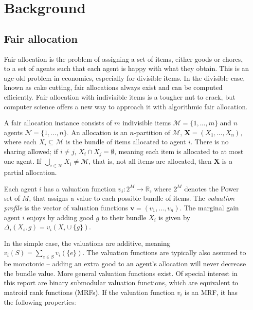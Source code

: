 \section{Background}\label{background}

\subsection{Fair allocation}
Fair allocation is the problem of assigning a set of items, either goods or chores, to a set of agents such that each agent is happy with what they obtain. This is an age-old problem in economics, especially for divisible items. In the divisible case, known as cake cutting, fair allocations always exist and can be computed efficiently. Fair allocation with indivisible items is a tougher nut to crack, but computer science offers a new way to approach it with algorithmic fair allocation.

A fair allocation instance consists of $m$ indivisible items $\mathcal{M} = \{1, \ldots ,m\}$ and $n$ agents $\mathcal{N} = \{1, \ldots ,n\}$. An allocation is an $n$-partition of $\mathcal{M}$, $\textbf{X} = (X_1, \ldots, X_n)$, where each $X_i \subseteq \mathcal{M}$ is the bundle of items allocated to agent $i$. There is no sharing allowed; if $i \not = j$, $X_i \cap X_j = \emptyset$, meaning each item is allocated to at most one agent. If $\bigcup_{i \in \mathcal{N} } X_i  \not =  \mathcal{M}$, that is, not all items are allocated, then $\textbf{X}$ is a partial allocation.

Each agent $i$ has a valuation function $v_i: 2^M \rightarrow \mathbb{R}$, where $2^M$ denotes the Power set of $M$, that assigns a value to each possible bundle of items. The \textit{valuation profile} is the vector of valuation functions $\mathbf{v} = (v_1, \ldots, v_n)$. The marginal gain agent $i$ enjoys by adding good $g$ to their bundle $X_i$ is given by $\Delta_i(X_i, g) = v_i(X_i \cup \{g\})$.

In the simple case, the valuations are additive, meaning $v_i(S) = \sum_{e \in S} v_i(\{e\})$. The valuation functions are typically also assumed to be monotonic – adding an extra good to an agent's allocation will never decrease the bundle value. More general valuation functions exist. Of special interest in this report are binary submodular valuation functions, which are equivalent to matroid rank functions (MRFs). If the valuation function $v_i$ is an MRF, it has the following properties:

